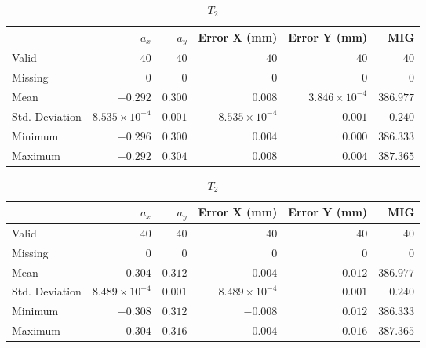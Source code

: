 \begin{table}[h]
    \centering
    \begin{subtable}{\textwidth}
        \centering
        \footnotesize
        \begin{tabular}{lrrrrr}
            \toprule
                & $a_x$ & $a_y$ & Error X (mm) & Error Y (mm) & MIG  \\
            \midrule
			Valid & $40$ & $40$ & $40$ & $40$ & $40$  \\
			Missing & $0$ & $0$ & $0$ & $0$ & $0$  \\
			Mean & $-0.292$ & $0.300$ & $0.008$ & $3.846\times10^{-4}$ & $386.977$  \\
			Std. Deviation & $8.535\times10^{-4}$ & $0.001$ & $8.535\times10^{-4}$ & $0.001$ & $0.240$  \\
			Minimum & $-0.296$ & $0.300$ & $0.004$ & $0.000$ & $386.333$  \\
			Maximum & $-0.292$ & $0.304$ & $0.008$ & $0.004$ & $387.365$  \\
            \bottomrule
        \end{tabular}
        \caption{$T_1$}
    \end{subtable}
    
    \vspace{10pt} %
    
    \begin{subtable}{\textwidth}
        \centering
        \footnotesize
        \begin{tabular}{lrrrrr}
            \toprule
                & $a_x$ & $a_y$ & Error X (mm) & Error Y (mm) & MIG  \\
            \midrule
			Valid & $40$ & $40$ & $40$ & $40$ & $40$  \\
			Missing & $0$ & $0$ & $0$ & $0$ & $0$  \\
			Mean & $-0.304$ & $0.312$ & $-0.004$ & $0.012$ & $386.977$  \\
			Std. Deviation & $8.489\times10^{-4}$ & $0.001$ & $8.489\times10^{-4}$ & $0.001$ & $0.240$  \\
			Minimum & $-0.308$ & $0.312$ & $-0.008$ & $0.012$ & $386.333$  \\
			Maximum & $-0.304$ & $0.316$ & $-0.004$ & $0.016$ & $387.365$  \\
            \bottomrule
        \end{tabular}
        \caption{$T_2$}
    \end{subtable}


\end{table}

